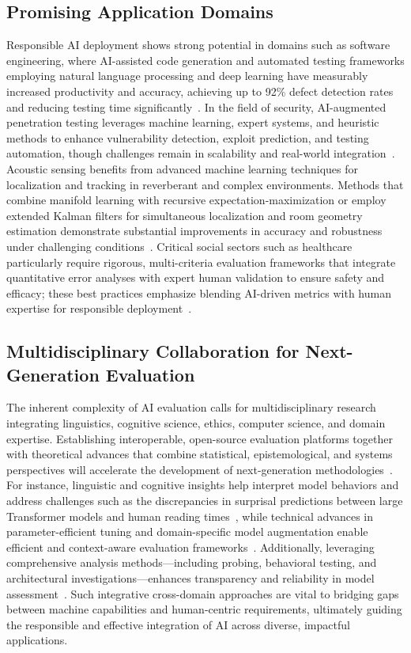 \documentclass[sigconf]{acmart}
\begin{document}
\subsection{Promising Application Domains}

Responsible AI deployment shows strong potential in domains such as software engineering, where AI-assisted code generation and automated testing frameworks employing natural language processing and deep learning have measurably increased productivity and accuracy, achieving up to 92\% defect detection rates and reducing testing time significantly~\cite{ref15,ref30,ref33}. In the field of security, AI-augmented penetration testing leverages machine learning, expert systems, and heuristic methods to enhance vulnerability detection, exploit prediction, and testing automation, though challenges remain in scalability and real-world integration~\cite{ref31}. Acoustic sensing benefits from advanced machine learning techniques for localization and tracking in reverberant and complex environments. Methods that combine manifold learning with recursive expectation-maximization or employ extended Kalman filters for simultaneous localization and room geometry estimation demonstrate substantial improvements in accuracy and robustness under challenging conditions~\cite{ref38,ref39}. Critical social sectors such as healthcare particularly require rigorous, multi-criteria evaluation frameworks that integrate quantitative error analyses with expert human validation to ensure safety and efficacy; these best practices emphasize blending AI-driven metrics with human expertise for responsible deployment~\cite{ref31}.

\subsection{Multidisciplinary Collaboration for Next-Generation Evaluation}

The inherent complexity of AI evaluation calls for multidisciplinary research integrating linguistics, cognitive science, ethics, computer science, and domain expertise. Establishing interoperable, open-source evaluation platforms together with theoretical advances that combine statistical, epistemological, and systems perspectives will accelerate the development of next-generation methodologies~\cite{ref35,ref36,ref48,ref49}. For instance, linguistic and cognitive insights help interpret model behaviors and address challenges such as the discrepancies in surprisal predictions between large Transformer models and human reading times~\cite{ref35}, while technical advances in parameter-efficient tuning and domain-specific model augmentation enable efficient and context-aware evaluation frameworks~\cite{ref48,ref49}. Additionally, leveraging comprehensive analysis methods—including probing, behavioral testing, and architectural investigations—enhances transparency and reliability in model assessment~\cite{ref36}. Such integrative cross-domain approaches are vital to bridging gaps between machine capabilities and human-centric requirements, ultimately guiding the responsible and effective integration of AI across diverse, impactful applications.



\end{document}
